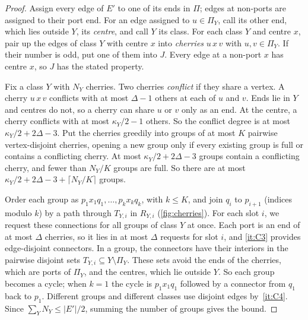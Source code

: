 \documentclass[11pt]{article}
\theoremstyle{definition}
\theoremstyle{remark}
\numberwithin{equation}{section}
\numberwithin{figure}{section}
\numberwithin{table}{section}
\begin{document}
\begin{proof}
Assign every edge of $E'$ to one of its ends in $\Pi$; edges at non-ports are
assigned to their port end. For an edge assigned to $u\in\Pi_Y$, call its other
end, which lies outside $Y$, its \emph{centre}, and call $Y$ its class. For
each class $Y$ and centre $x$, pair up the edges of class $Y$ with centre $x$
into \emph{cherries} $u\,x\,v$ with $u,v\in\Pi_Y$. If their number is odd, put
one of them into $J$. Every edge at a non-port $x$ has centre $x$, so $J$ has
the stated property.

Fix a class $Y$ with $N_Y$ cherries. Two cherries \emph{conflict} if they share
a vertex. A cherry $u\,x\,v$ conflicts with at most $\Delta-1$ others at each of
$u$ and $v$. Ends lie in $Y$ and centres do not, so a cherry can share $u$ or
$v$ only as an end. At the centre, a cherry conflicts with at most
$\kappa_Y/2-1$ others. So the conflict degree is at most $\kappa_Y/2+2\Delta-3$.
Put the cherries greedily into groups of at most $K$ pairwise vertex-disjoint
cherries, opening a new group only if every existing group is full or contains
a conflicting cherry. At most $\kappa_Y/2+2\Delta-3$ groups contain a
conflicting cherry, and fewer than $N_Y/K$ groups are full. So there are at most
$\kappa_Y/2+2\Delta-3+\lceil N_Y/K\rceil$ groups.

Order each group as $p_1x_1q_1,\dots,p_kx_kq_k$, with $k\le K$, and join $q_i$
to $p_{i+1}$ (indices modulo $k$) by a path through $T_{Y,i}$ in $R_{Y,i}$
(\cref{fig:cherries}). For each slot $i$, we request these connections for all
groups of class $Y$ at once. Each port is an end of at most $\Delta$ cherries,
so it lies in at most $\Delta$ requests for slot $i$, and \ref{it:C3} provides
edge-disjoint connectors. In a group, the connectors have their interiors in
the pairwise disjoint sets $T_{Y,i}\subseteq Y\setminus\Pi_Y$. These sets avoid
the ends of the cherries, which are ports of $\Pi_Y$, and the centres, which lie
outside $Y$. So each group becomes a cycle; when $k=1$ the cycle is $p_1x_1q_1$
followed by a connector from $q_1$ back to $p_1$. Different groups and
different classes use disjoint edges by~\ref{it:C4}. Since
$\sum_YN_Y\le|E'|/2$, summing the number of groups gives the bound.
\end{proof}
\end{document}
